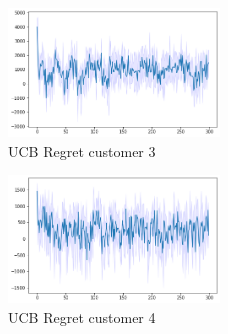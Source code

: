 \begin{multicols}{2}
    \begin{figure}[H]
        \begin{center}
        \includegraphics[width=0.5\textwidth]{img/ucb7_3regret.png}
        \caption{UCB Regret customer 3}
        \label{fig:regret73}
        \end{center}
    \end{figure}
    \columnbreak
    \begin{figure}[H]
        \begin{center}
        \includegraphics[width=0.5\textwidth]{img/ucb7_4regret.png}
        \caption{UCB Regret customer 4}
        \label{fig:regret74}
        \end{center}
    \end{figure}
\end{multicols}

